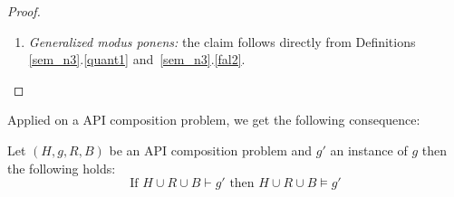 \begin{proof}
\begin{enumerate}
\item \emph{Generalized modus ponens:} the claim follows directly from Definitions \ref{sem_n3}.\ref{quant1} %
and~\ref{sem_n3}.\ref{fal2}.
\end{enumerate}
\end{proof}

Applied on a API composition problem, we get the following consequence:
\begin{corollary}
Let $(H,g,R,B)$ be an API composition problem and $g'$ an instance  of $g$ then the following holds:
\[\text{If }H\cup R \cup B \vdash g' \text{ then }H\cup R \cup B \models g'\]
\end{corollary}



%  
 


